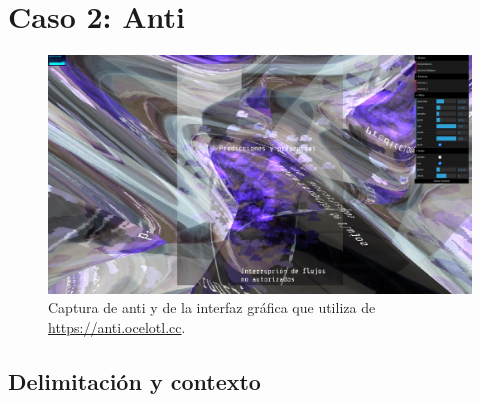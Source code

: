 \chapter{Caso 2: Anti}



\begin{figure}[tb]
\centering 
\includegraphics[width=\columnwidth]{../img/anti01.png} 
\caption[Captura de Anti]{Captura de anti y de la interfaz gráfica que utiliza de \url{https://anti.ocelotl.cc}.} %
\label{fig:gallery} 
\end{figure}





\section{Delimitación y contexto}



